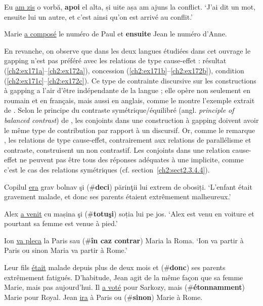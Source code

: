 \ea Eu \uline{am zis} o vorbă, \textbf{apoi} el alta, și uite așa am ajuns la conflict. \label{ch2:ex169}
\glt ‘J’ai dit un mot, ensuite lui un autre, et c’est ainsi qu’on est arrivé au conflit.’
\z

\ea Marie \uline{a composé} le numéro de Paul et \textbf{ensuite} Jean le numéro d’Anne. \label{ch2:ex170}
\z

En revanche, on observe que dans les deux langues étudiées dans cet ouvrage le gapping n’est pas préféré avec les relations de type cause-effet : résultat (\ref{ch2:ex171a}--\ref{ch2:ex172a}), concession (\ref{ch2:ex171b}--\ref{ch2:ex172b}), condition (\ref{ch2:ex171c}--\ref{ch2:ex172c}). Ce type de contrainte discursive sur les constructions à gapping a l’air d’être indépendante de la langue ; elle opère non seulement en roumain et en français, mais aussi en anglais, comme le montre l’exemple  extrait de \citet{CulicoverEtAl2005}. Selon le principe du contraste symétrique/équilibré (angl. \textit{principle of balanced contrast}) de \citet{Repp2009}, les conjoints dans une construction à gapping doivent avoir le même type de contribution par rapport à un  discursif. Or, comme le remarque \citet{Hendriks2004}, les relations de type cause-effet, contrairement aux relations de parallélisme et contraste, construisent un  non contrastif. Les conjoints dans une relation cause-effet ne peuvent pas être tous des réponses adéquates à une  implicite, comme c’est le cas des relations symétriques (cf. section~\ref{ch2:sect2.3.4.4}).

\ea
\ea Copilul \uline{era} grav bolnav şi (\#\textbf{deci}) părinţii lui extrem de obosiți. \label{ch2:ex171a}
\glt ‘L’enfant était gravement malade, et donc ses parents étaient extrêmement malheureux.’

\ex Alex \uline{a venit} cu mașina şi (\#\textbf{totuşi}) soția lui pe jos. \label{ch2:ex171b} 
\glt ‘Alex est venu en voiture et pourtant sa femme est venue à pied.’ 

\ex Ion \uline{va pleca} la Paris sau (\#\textbf{în caz contrar}) Maria la Roma. \label{ch2:ex171c} 
\glt ‘Ion va partir à Paris ou sinon Maria va partir à Rome.’  
\z
\z


\ea 
\ea Leur fils \uline{était} malade depuis plus de deux mois et (\#\textbf{donc}) ses parents extrêmement fatigués. \label{ch2:ex172a} 
\ex D’habitude, Jean agit de la même façon que sa femme Marie, mais pas aujourd’hui. Il \uline{a voté} pour Sarkozy, mais (\#\textbf{étonnamment}) Marie pour Royal. \label{ch2:ex172b}  
\ex Jean \uline{ira} à Paris ou (\#\textbf{sinon}) Marie à Rome. \label{ch2:ex172c}               
\z
\z



